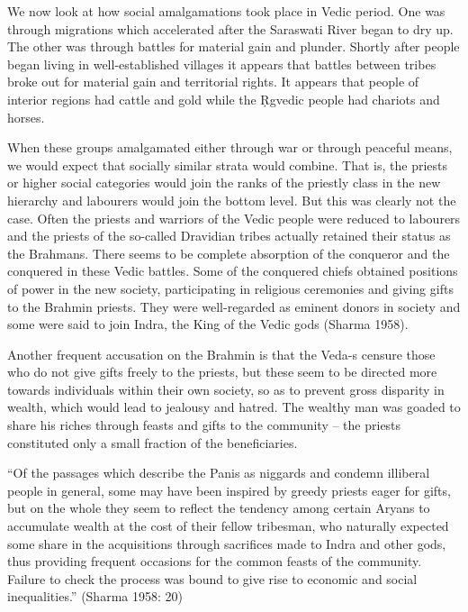 We now look at how social amalgamations took place in Vedic period. One was through migrations which accelerated after the Saraswati River began to dry up. The other was through battles for material gain and plunder. Shortly after people began living in well-established villages it appears that battles between tribes broke out for material gain and territorial rights. It appears that people of interior regions had cattle and gold while the Ṛgvedic people had chariots and horses. 

When these groups amalgamated either through war or through peaceful means, we would expect that socially similar strata would combine. That is, the priests or higher social categories would join the ranks of the priestly class in the new hierarchy and labourers would join the bottom level. But this was clearly not the case. Often the priests and warriors of the Vedic people were reduced to labourers and the priests of the so-called Dravidian tribes actually retained their status as the Brahmans. There seems to be complete absorption of the conqueror and the conquered in these Vedic battles. Some of the conquered chiefs obtained positions of power in the new society, participating in religious ceremonies and giving gifts to the Brahmin priests. They were well-regarded as eminent donors in society and some were said to join Indra, the King of the Vedic gods (Sharma 1958).

Another frequent accusation on the Brahmin is that the Veda-s censure those who do not give gifts freely to the priests, but these seem to be directed more towards individuals within their own society, so as to prevent gross disparity in wealth, which would lead to jealousy and hatred. The wealthy man was goaded to share his riches through feasts and gifts to the community – the priests constituted only a small fraction of the beneficiaries.

\begin{myquote}
“Of the passages which describe the Panis as niggards and condemn illiberal people in general, some may have been inspired by greedy priests eager for gifts, but on the whole they seem to reflect the tendency among certain Aryans to accumulate wealth at the cost of their fellow tribesman, who naturally expected some share in the acquisitions through sacrifices made to Indra and other gods, thus providing frequent occasions for the common feasts of the community. Failure to check the process was bound to give rise to economic and social inequalities.” (Sharma 1958: 20)
\end{myquote}

